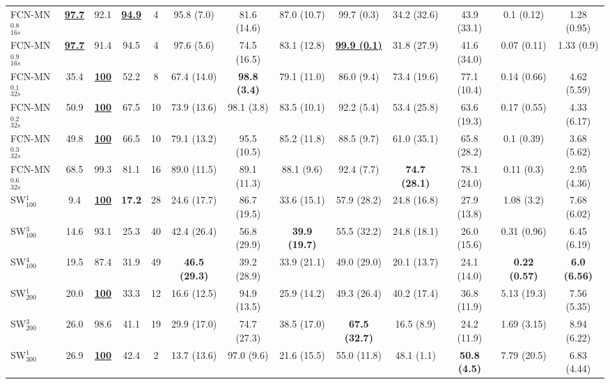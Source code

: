 \documentclass[a4paper,authoryear,review]{elsarticle}
\begin{document}
\begin{table}[]
\begin{adjustbox}{angle=90}
{\begin{tabular}{lcccccccccccc}
                FCN-MN$_{16s}^{0.8}$ & {\ul \textbf{97.7}} & 92.1 & {\ul \textbf{94.9}} & 4 & 95.8 (7.0) & 81.6 (14.6) & 87.0 (10.7) & 99.7 (0.3) & 34.2 (32.6) & 43.9 (33.1) & 0.1 (0.12) & 1.28 (0.95) \\
                FCN-MN$_{16s}^{0.9}$ & {\ul \textbf{97.7}} & 91.4 & 94.5 & 4 & 97.6 (5.6) & 74.5 (16.5) & 83.1 (12.8) & {\ul \textbf{99.9 (0.1)}} & 31.8 (27.9) & 41.6 (34.0) & 0.07 (0.11) & 1.33 (0.9) \\
                FCN-MN$_{32s}^{0.1}$ & 35.4 & {\ul \textbf{100}} & 52.2 & 8 & 67.4 (14.0) & \textbf{98.8 (3.4)} & 79.1 (11.0) & 86.0 (9.4) & 73.4 (19.6) & 77.1 (10.4) & 0.14 (0.66) & 4.62 (5.59) \\
                FCN-MN$_{32s}^{0.2}$ & 50.9 & {\ul \textbf{100}} & 67.5 & 10 & 73.9 (13.6) & 98.1 (3.8) & 83.5 (10.1) & 92.2 (5.4) & 53.4 (25.8) & 63.6 (19.3) & 0.17 (0.55) & 4.33 (6.17) \\
                FCN-MN$_{32s}^{0.3}$ & 49.8 & {\ul \textbf{100}} & 66.5 & 10 & 79.1 (13.2) & 95.5 (10.5) & 85.2 (11.8) & 88.5 (9.7) & 61.0 (35.1) & 65.8 (28.2) & 0.1 (0.39) & 3.68 (5.62) \\
                FCN-MN$_{32s}^{0.6}$ & 68.5 & 99.3 & 81.1 & 16 & 89.0 (11.5) & 89.1 (11.3) & 88.1 (9.6) & 92.4 (7.7) & \textbf{74.7 (28.1)} & 78.1 (24.0) & 0.11 (0.3) & 2.95 (4.36) \\
                SW$_{100}^{1}$ & 9.4 & {\ul \textbf{100}} & \textbf{17.2} & 28 & 24.6 (17.7) & 86.7 (19.5) & 33.6 (15.1) & 57.9 (28.2) & 24.8 (16.8) & 27.9 (13.8) & 1.08 (3.2) & 7.68 (6.02) \\
                SW$_{100}^{3}$ & 14.6 & 93.1 & 25.3 & 40 & 42.4 (26.4) & 56.8 (29.9) & \textbf{39.9 (19.7)} & 55.5 (32.2) & 24.8 (18.1) & 26.0 (15.6) & 0.31 (0.96) & 6.45 (6.19) \\
                SW$_{100}^{4}$ & 19.5 & 87.4 & 31.9 & 49 & \textbf{46.5 (29.3)} & 39.2 (28.9) & 33.9 (21.1) & 49.0 (29.0) & 20.1 (13.7) & 24.1 (14.0) & \textbf{0.22 (0.57)} & \textbf{6.0 (6.56)} \\
                SW$_{200}^{1}$ & 20.0 & {\ul \textbf{100}} & 33.3 & 12 & 16.6 (12.5) & 94.9 (13.5) & 25.9 (14.2) & 49.3 (26.4) & 40.2 (17.4) & 36.8 (11.9) & 5.13 (19.3) & 7.56 (5.35) \\
                SW$_{200}^{3}$ & 26.0 & 98.6 & 41.1 & 19 & 29.9 (17.0) & 74.7 (27.3) & 38.5 (17.0) & \textbf{67.5 (32.7)} & 16.5 (8.9) & 24.2 (11.9) & 1.69 (3.15) & 8.94 (6.22) \\
                SW$_{300}^{1}$ & 26.9 & {\ul \textbf{100}} & 42.4 & 2 & 13.7 (13.6) & 97.0 (9.6) & 21.6 (15.5) & 55.0 (11.8) & 48.1 (1.1) & \textbf{50.8 (4.5)} & 7.79 (20.5) & 6.83 (4.44) \\

\end{tabular}}
\end{adjustbox}
\end{table}
\end{document}
